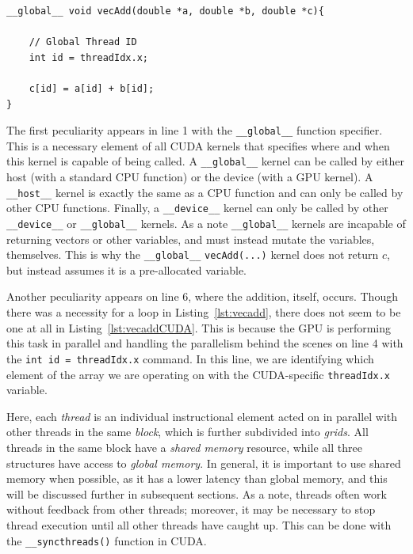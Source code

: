 \begin{lstlisting}[float,label=lst:vecaddCUDA, style=c++,caption=An example of a vector addition kernel in CUDA]
__global__ void vecAdd(double *a, double *b, double *c){

    // Global Thread ID
    int id = threadIdx.x;

    c[id] = a[id] + b[id];
}
\end{lstlisting}

The first peculiarity appears in line 1 with the \texttt{\_\_global\_\_} function specifier.
This is a necessary element of all CUDA kernels that specifies where and when this kernel is capable of being called.
A \texttt{\_\_global\_\_} kernel can be called by either host (with a standard CPU function) or the device (with a GPU kernel).
A \texttt{\_\_host\_\_} kernel is exactly the same as a CPU function and can only be called by other CPU functions.
Finally, a \texttt{\_\_device\_\_} kernel can only be called by other \texttt{\_\_device\_\_} or \texttt{\_\_global\_\_} kernels.
As a note \texttt{\_\_global\_\_} kernels are incapable of returning vectors or other variables, and must instead mutate the variables, themselves.
This is why the \texttt{\_\_global\_\_} \texttt{vecAdd(...)} kernel does not return $c$, but instead assumes it is a pre-allocated variable.

Another peculiarity appears on line 6, where the addition, itself, occurs.
Though there was a necessity for a loop in Listing~\ref{lst:vecadd}, there does not seem to be one at all in Listing~\ref{lst:vecaddCUDA}.
This is because the GPU is performing this task in parallel and handling the parallelism behind the scenes on line 4 with the \texttt{int id = threadIdx.x} command.
In this line, we are identifying which element of the array we are operating on with the CUDA-specific \texttt{threadIdx.x} variable.

Here, each \textit{thread} is an individual instructional element acted on in parallel with other threads in the same \textit{block}, which is further subdivided into \textit{grids}.
All threads in the same block have a \textit{shared memory} resource, while all three structures have access to \textit{global memory}.
In general, it is important to use shared memory when possible, as it has a lower latency than global memory, and this will be discussed further in subsequent sections.
As a note, threads often work without feedback from other threads; moreover, it may be necessary to stop thread execution until all other threads have caught up.
This can be done with the \texttt{\_\_syncthreads()} function in CUDA.

